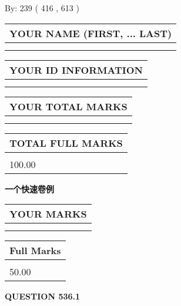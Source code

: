 \documentclass{ctexart}
\begin{document}
   
\hspace{1.0in} By: 
 239 ( 416 ,  613 )
   
   
   
   
\newpage 
\setcounter{page}{ 
   536001 } 
   
   
   
   
\noindent\begin{tabular}{|l|}
\hline
YOUR NAME (FIRST, ... LAST)  \\
\hline
 \\ 
 \\ 
\hline
\end{tabular}
\hspace{0.05in} \begin{tabular}{|l|}
\hline
 YOUR   ID   INFORMATION  \\
\hline
 \\ 
 \\ 
\hline
\end{tabular}
   
   
\vspace{0.2in}\noindent\begin{tabular}{|l|}
\hline
YOUR TOTAL MARKS  \\
\hline
 \\ 
 \\ 
\hline
\end{tabular}
\hspace{0.05in} \begin{tabular}{|l|}
\hline
TOTAL FULL MARKS  \\
\hline
 \\ 
100.00 \\
\hline
\end{tabular}
   
   
 \vspace{0.2in}
{\LARGE {\textbf{ 一个快速卷例}}}
   
   
  
\vspace{0.2in}
  
\noindent\begin{tabular}{|l|}
\hline
 YOUR MARKS  \\
\hline
 \\ 
 \\ 
\hline
\end{tabular}
\hspace{0.05in} \begin{tabular}{|l|}
\hline
 Full Marks  \\
\hline
 \\ 
50.00 \\
\hline
\end{tabular}
{\textbf{\Large{QUESTION
536.1 
}}}
  
\end{document}
